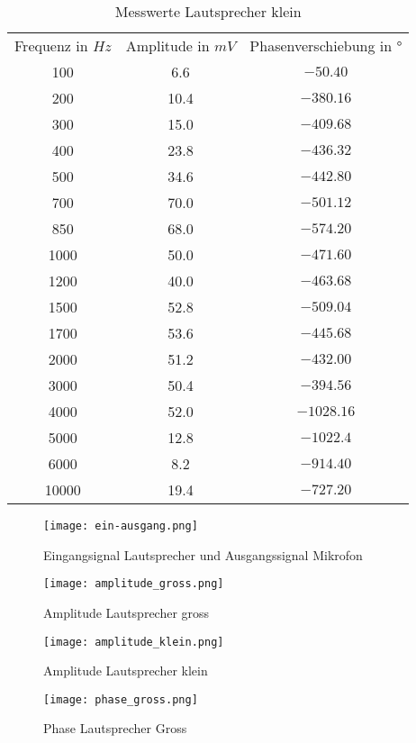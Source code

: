 \begin{table}[H]
\centering
\begin{tabular}{ccc}
  Frequenz in $Hz$ & Amplitude in $mV$ &  Phasenverschiebung in $°$ \\
  100 &  6.6& $-50.40$ \\
  200 & 10.4 & $-380.16$ \\
  300 & 15.0 & $-409.68$ \\
  400 & 23.8 & $-436.32$ \\
  500 & 34.6 & $-442.80$ \\
  700 & 70.0 & $-501.12$ \\
  850 & 68.0 & $-574.20$ \\
  1000 & 50.0 & $-471.60$ \\
  1200 & 40.0 & $-463.68$ \\
  1500 & 52.8 & $-509.04$ \\
  1700 & 53.6 & $-445.68$ \\
  2000 & 51.2 & $-432.00$ \\
  3000 & 50.4 & $-394.56$ \\
  4000 & 52.0 & $-1028.16$ \\
  5000 & 12.8 & $-1022.4$ \\
  6000 & 8.2 & $-914.40$ \\
  10000 & 19.4 & $-727.20$ \\
 \end{tabular}
\label{tab:MLk}
\caption{Messwerte Lautsprecher klein}
\end{table}

\begin{figure}[H]
\centering
\texttt{[image: ein-ausgang.png]}
\caption{Eingangsignal Lautsprecher und Ausgangssignal Mikrofon}
\label{img:EingangAusgang}
\end{figure}

\begin{figure}[H]
\centering
\texttt{[image: amplitude\_gross.png]}
\caption{Amplitude Lautsprecher gross}
\label{img:AmplitudeLGross}
\end{figure}

\begin{figure}[H]
\centering
\texttt{[image: amplitude\_klein.png]}
\caption{Amplitude Lautsprecher klein}
\label{img:AmplitudeLklein}
\end{figure}

\begin{figure}[H]
\centering
\texttt{[image: phase\_gross.png]}
\caption{Phase Lautsprecher Gross}
\label{img:phase_gross}
\end{figure}


